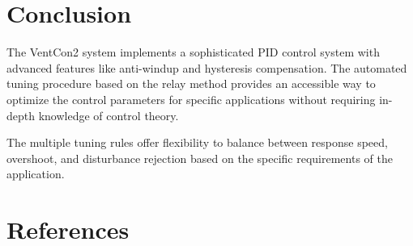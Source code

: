 \documentclass[a4paper,11pt]{article}
\begin{document}
\section{Conclusion}

The VentCon2 system implements a sophisticated PID control system with advanced features like anti-windup and hysteresis compensation. The automated tuning procedure based on the relay method provides an accessible way to optimize the control parameters for specific applications without requiring in-depth knowledge of control theory\cite{astrom1995pid}.

The multiple tuning rules offer flexibility to balance between response speed, overshoot, and disturbance rejection based on the specific requirements of the application\cite{odwyer2009handbook}\cite{controlguru}\cite{controlnotes}\cite{oreilly:pidtuning}.

\nocite{*}  %

\section{References}
\end{document}
